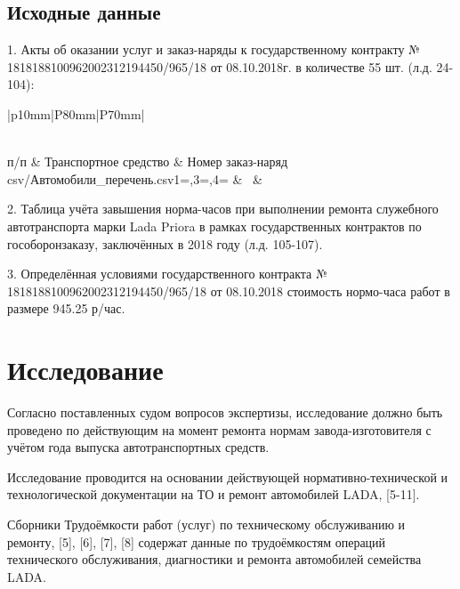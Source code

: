 \subsection{Исходные данные}

1. Акты об оказании услуг и заказ-наряды к государственному контракту № 1818188100962002312194450/965/18 от 08.10.2018г. в количестве 55 шт. (л.д. 24-104):


\begin{longtable}{|p{10mm}|P{80mm}|P{70mm}|}
	\caption[]{\footnotesize {\textbf{Перечень транспортных средств и соответствующих им актов об оказании услуг и заказ-нарядов к государственному контракту № 1818188100962002312194450/965/18 от 08.10.2018. }}} \label{tab:hist}\\
	\hline%
	п/п	& Транспортное средство & Номер заказ-наряд\\\hline\hline\endhead
	\csvreader[separator=semicolon, late after line=\\\hline]%
	{csv/Автомобили_перечень.csv}{1=,3=\firstname,4=\matnumber}%
	{\thecsvrow & \firstname~ & \matnumber}%
	
\end{longtable}




2. Таблица учёта завышения норма-часов при выполнении ремонта служебного автотранспорта марки Lada Priora  в рамках государственных контрактов по гособоронзаказу, заключённых в 2018 году (л.д. 105-107). 

3. Определённая условиями государственного контракта  № 1818188100962002312194450/965/18 от 08.10.2018 стоимость  нормо-часа работ в размере {945.25 р/час}.



\section{Исследование}

Согласно поставленных судом вопросов экспертизы, исследование должно быть проведено по действующим на момент ремонта  нормам завода-изготовителя с учётом года выпуска автотранспортных средств.

Исследование проводится на основании действующей нормативно-технической и технологической документации на ТО и ремонт автомобилей LADA, [5-11].


Сборники Трудоёмкости работ (услуг) по техническому обслуживанию и ремонту, [5], [6], [7], [8] содержат данные по трудоёмкостям операций технического обслуживания, диагностики и ремонта автомобилей семейства LADA.  

